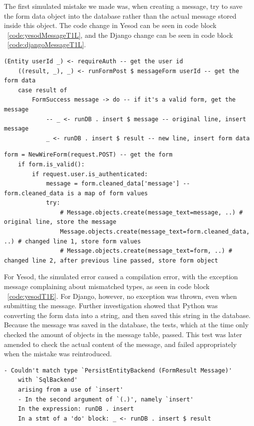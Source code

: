 The first simulated mistake we made was, when creating a message, try
to save the form data object into the database rather than the actual
message stored inside this object. The code change in Yesod can be
seen in code block ~\ref{code:yesodMessageT1L}, and the Django change can
be seen in code block ~\ref{code:djangoMessageT1L}.


\begin{lstlisting}[caption={Yesod Code Change},label={code:yesodMessageT1L}]
	(Entity userId _) <- requireAuth -- get the user id
	((result, _), _) <- runFormPost $ messageForm userId -- get the form data
	case result of
		FormSuccess message -> do -- if it's a valid form, get the message
			-- _ <- runDB . insert $ message -- original line, insert message
			_ <- runDB . insert $ result -- new line, insert form data
\end{lstlisting}

\clearpage

\begin{lstlisting}[caption={Django Code Change},label={code:djangoMessageT1L}]
	form = NewWireForm(request.POST) -- get the form
	if form.is_valid():
		if request.user.is_authenticated:
			message = form.cleaned_data['message'] -- form.cleaned_data is a map of form values
			try:
				# Message.objects.create(message_text=message, ..) # original line, store the message
				Message.objects.create(message_text=form.cleaned_data, ..) # changed line 1, store form values
				# Message.objects.create(message_text=form, ..) # changed line 2, after previous line passed, store form object
\end{lstlisting}

For Yesod, the simulated error caused a compilation error, with the exception
message complaining about mismatched types, as seen in code block ~\ref{code:yesodT1E}. 
For Django, however, no exception was thrown, even when submitting the message. 
Further investigation showed that Python was converting the form data into a
string, and then saved this string in the database. Because the message was saved 
in the database, the tests, which at the time only checked the amount of objects
in the message table, passed. This test was later amended to check the actual
content of the message, and failed appropriately when the mistake was reintroduced.

\begin{lstlisting}[caption={Yesod Exception Message},label={code:yesodT1E}]
	- Couldn't match type `PersistEntityBackend (FormResult Message)'
	with `SqlBackend'
	arising from a use of `insert'
	- In the second argument of `(.)', namely `insert'
	In the expression: runDB . insert
	In a stmt of a 'do' block: _ <- runDB . insert $ result
\end{lstlisting}

